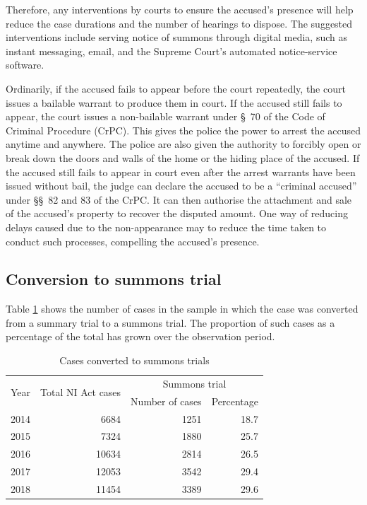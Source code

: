 \documentclass[12pt,a4paper]{article}
\begin{document}
Therefore, any interventions by courts to ensure the accused's presence will help reduce the case durations and the number of hearings to dispose. The suggested interventions include serving notice of summons through digital media, such as instant messaging, email, and the Supreme Court's automated notice-service software.

Ordinarily, if the accused fails to appear before the court repeatedly, the court issues a bailable warrant to produce them in court. If the accused still fails to appear, the court issues a non-bailable warrant under \S~70 of the Code of Criminal Procedure (CrPC). This gives the police the power to arrest the accused anytime and anywhere. The police are also given the authority to forcibly open or break down the doors and walls of the home or the hiding place of the accused. If the accused still fails to appear in court even after the arrest warrants have been issued without bail, the judge can declare the accused to be a ``criminal accused'' under \S\S~82 and 83 of the CrPC. It can then authorise the attachment and sale of the accused's property to recover the disputed amount. One way of reducing delays caused due to the non-appearance may to reduce the time taken to conduct such processes, compelling the accused's presence.

\subsection{Conversion to summons trial}
\label{sec:conv -summ-trial-1}

Table \ref{tab:summons_yearWise} shows the number of cases in the sample in which the case was converted from a summary trial to a summons trial. The proportion of such cases as a percentage of the total has grown over the observation period.

\begin{longtable}{@{}lrrr@{}}
 \caption{Cases converted to summons trials}\label{tab:summons_yearWise}\\
 \toprule
 \multirow{2}{*}{Year} & \multirow{2}{*}{Total NI Act cases} & \multicolumn{2}{c}{Summons trial}\\
 \cmidrule{3-4}
 && Number of cases & Percentage \\
 \midrule\endhead
 2014 & 6684 & 1251 & 18.7 \\
 2015 & 7324 & 1880 & 25.7 \\
 2016 & 10634 & 2814 & 26.5 \\
 2017 & 12053 & 3542 & 29.4 \\
 2018 & 11454 & 3389 & 29.6 \\
 \bottomrule
\end{longtable}
\end{document}
